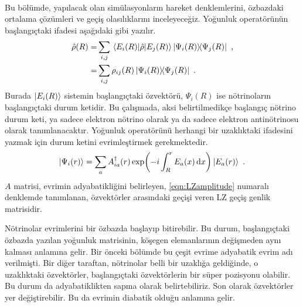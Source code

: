 \paragraph{}
Bu bölümde, yapılacak olan simülasyonların hareket denklemlerini, özbazdaki ortalama çözümleri ve geçiş olasılıklarını inceleyeceğiz.  Yoğunluk operatörünün başlangıçtaki ifadesi aşağıdaki gibi yazılır.
\begin{align}
    \nonumber \hat{\rho}(R) =& \sum_{i,j} \mel{E_{i}(R)}{\hat{\rho}}{E_{j}(R)} \dyad{\Psi_{i}(R)}{\Psi_{j}(R)} \text{ ,}\\
    = & \sum_{i,j} \rho_{ij}(R) \dyad{\Psi_{i}(R)}{\Psi_{j}(R)} \text{ .}
\end{align}
Burada $ \ket{E_{i}(R)} $ sistemin başlangıçtaki özvektörü, $ \Psi_{i}(R) $ ise nötrinoların başlangıçtaki durum ketidir. Bu çalışmada, aksi belirtilmedikçe başlangıç nötrino durum keti, ya sadece elektron nötrino olarak ya da sadece elektron antinötrinosu olarak tanımlanacaktır. Yoğunluk operatörünü herhangi bir uzaklıktaki ifadesini yazmak için durum ketini evrimleştirmek gerekmektedir.
\begin{equation}\label{eqn:psiAexp}
    \ket{\Psi_{i}(r)} = \sum_{a} A^{\dagger}_{ia}(r) \exp(-i\int^{r}_{R} E_{a}(x) \dd{x}) \ket{E_{a}(r)} \text{ .}
\end{equation}
$ A $ matrisi, evrimin adyabatikliğini belirleyen, \eqref{eqn:LZamplitude} numaralı denklemde tanımlanan, özvektörler arasındaki geçişi veren LZ geçiş genlik matrisidir. 

Nötrinolar evrimlerini bir özbazda başlayıp bitirebilir. Bu durum, başlangıçtaki özbazda yazılan yoğunluk matrisinin, köşegen elemanlarının değişmeden aynı kalması anlamına gelir. Bir önceki bölümde bu çeşit evrime adyabatik evrim adı verilmişti. Bir diğer taraftan, nötrinolar belli bir uzaklığa geldiğinde, o uzaklıktaki özvektörler, başlangıçtaki özvektörlerin bir süper pozisyonu olabilir. Bu durum da adyabatiklikten sapma olarak belirtebiliriz. Son olarak özvektörler yer değiştirebilir. Bu da evrimin diabatik olduğu anlamına gelir.

